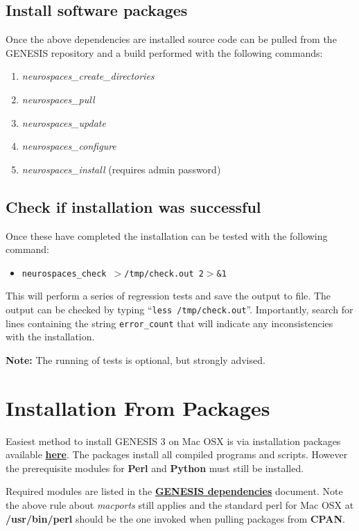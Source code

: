 \documentclass[12pt]{article}
\begin{document}
\subsection*{Install software packages}

Once the above dependencies are installed source code can be pulled from the GENESIS repository and a build performed with the following commands:
\begin{enumerate}
   \item{\it neurospaces\_create\_directories}
   \item{\it neurospaces\_pull}
   \item{\it neurospaces\_update}
   \item{\it neurospaces\_configure}
   \item{\it neurospaces\_install} (requires admin password) 
\end{enumerate}

\subsection*{Check if installation was successful}

Once these have completed the installation can be tested with the following command:
\begin{itemize}
   \item[]{\tt neurospaces\_check $>$/tmp/check.out 2$>$\&1}
\end{itemize}
This will perform a series of regression tests and save the output to file. The output can be checked by typing ``{\tt less /tmp/check.out}''. Importantly, search for lines containing the string {\tt error\_count} that will indicate any inconsistencies with the installation.

{\bf Note:} The running of tests is optional, but strongly advised.



\section*{Installation From Packages}

	Easiest method to install GENESIS 3 on Mac OSX is via installation packages available \href{http://repo-genesis3.cbi.utsa.edu/osx/}{\bf here}. The packages install all compiled programs and scripts. However the prerequisite modules for {\bf Perl} and {\bf Python} must still be installed. 
	
	Required modules are listed in the \href{../genesis-dependencies/genesis-dependencies.tex}{\bf GENESIS dependencies} document. Note the above rule about {\it macports} still applies and the standard perl for Mac OSX at {\bf /usr/bin/perl} should be the one invoked when pulling packages from {\bf CPAN}.
\end{document}
